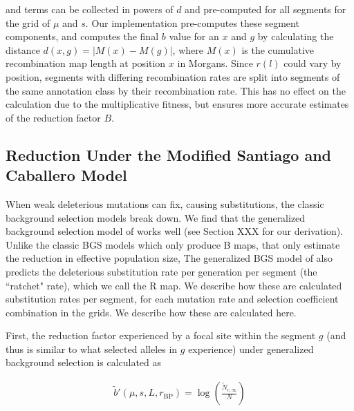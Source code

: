 \documentclass[11pt]{article}
\begin{document}
and terms can be collected in powers of $d$ and pre-computed for all segments
for the grid of $\mu$ and $s$. Our implementation pre-computes these segment
components, and computes the final $b$ value for an $x$ and $g$ by calculating
the distance $d(x,g) = |M(x) - M(g)|$, where $M(x)$ is the cumulative
recombination map length at position $x$ in Morgans. Since $r(l)$ could vary by
position, segments with differing recombination rates are split into segments
of the same annotation class by their recombination rate. This has no effect on
the calculation due to the multiplicative fitness, but ensures more accurate
estimates of the reduction factor $B$.


\subsection{Reduction Under the Modified Santiago and Caballero Model}

When weak deleterious mutations can fix, causing substitutions, the classic
background selection models break down. We find that the generalized background
selection model of \textcite{Santiago2016-mu} works well (see Section XXX for
our derivation). Unlike the classic BGS models which only produce B maps, that
only estimate the reduction in effective population size, The generalized BGS
model of \textcite{Santiago2016-mu} also predicts the deleterious substitution
rate per generation per segment (the ``ratchet" rate), which we call the R map.
We describe how these are calculated substitution rates per segment, for each
mutation rate and selection coefficient combination in the grids. We describe
how these are calculated here.

First, the reduction factor experienced by a focal site within the segment $g$
(and thus is similar to what selected alleles in $g$ experience) under
generalized background selection is calculated as

\begin{align}
  \widetilde{b}'(\mu, s, L, r_\text{BP}) = \log\left(\frac{\widetilde{N}_{e,\infty}}{N} \right)
\end{align}
\end{document}
